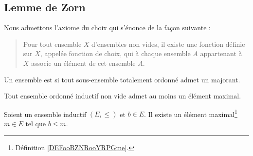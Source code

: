 \subsection{Lemme de Zorn}

Nous admettons l'axiome du choix\cite{BIBooBZJMooJDJRgg} qui s'énonce de la façon suivante\cite{BIBooTQMWooFFAQQZ} :
\begin{quote}
    Pour tout ensemble $X$ d'ensembles non vides, il existe une fonction définie sur $X$, appelée fonction de choix, qui à chaque ensemble $A$ appartenant à $X$ associe un élément de cet ensemble $A$.
\end{quote}

\begin{definition}  \label{DefGHDfyyz}
    Un ensemble est  si tout sous-ensemble totalement ordonné admet un majorant.
\end{definition}


\begin{lemma}    \label{LemUEGjJBc}
    Tout ensemble ordonné inductif non vide admet au moins un élément maximal.
\end{lemma}

\begin{proposition}       \label{PROPooFOETooWYLOeq}
    Soient un ensemble inductif \( (E,\leq)\) et \( b\in E\). Il existe un élément maximal\footnote{Définition \ref{DEFooBZNRooYRPGme}.} \( m\in E\) tel que \( b\leq m\).
\end{proposition}

